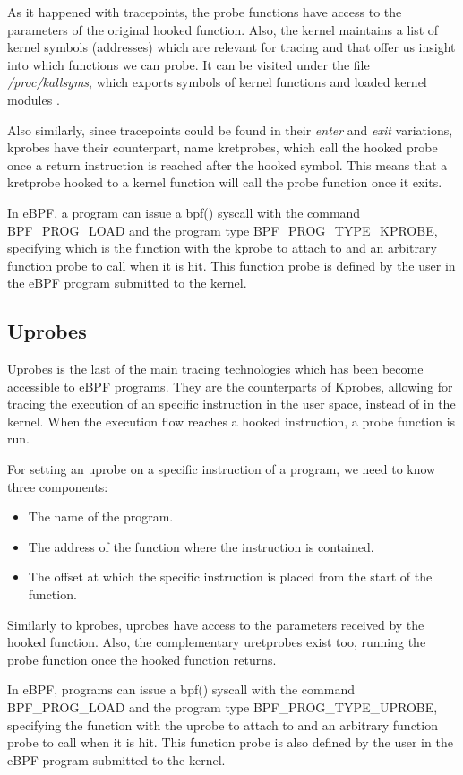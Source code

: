 As it happened with tracepoints, the probe functions have access to the parameters of the original hooked function. Also, the kernel maintains a list of kernel symbols (addresses) which are relevant for tracing and that offer us insight into which functions we can probe. It can be visited under the file \textit{/proc/kallsyms}, which exports symbols of kernel functions and loaded kernel modules \cite{kallsyms_kernel}.

Also similarly, since tracepoints could be found in their \textit{enter} and \textit{exit} variations, kprobes have their counterpart, name kretprobes, which call the hooked probe once a return instruction is reached after the hooked symbol. This means that a kretprobe hooked to a kernel function will call the probe function once it exits.

In eBPF, a program can issue a bpf() syscall with the command BPF\_PROG\_LOAD and the program type BPF\_PROG\_TYPE\_KPROBE, specifying which is the function with the kprobe to attach to and an arbitrary function probe to call when it is hit. This function probe is defined by the user in the eBPF program submitted to the kernel.

\subsection{Uprobes}
Uprobes is the last of the main tracing technologies which has been become accessible to eBPF programs. They are the counterparts of Kprobes, allowing for tracing the execution of an specific instruction in the user space, instead of in the kernel. When the execution flow reaches a hooked instruction, a probe function is run. 

For setting an uprobe on a specific instruction of a program, we need to know three components:
\begin{itemize}
\item The name of the program.
\item The address of the function where the instruction is contained.
\item The offset at which the specific instruction is placed from the start of the function.
\end{itemize}

Similarly to kprobes, uprobes have access to the parameters received by the hooked function. Also, the complementary uretprobes exist too, running the probe function once the hooked function returns.

In eBPF, programs can issue a bpf() syscall with the command BPF\_PROG\_LOAD and the program type BPF\_PROG\_TYPE\_UPROBE, specifying the function with the uprobe to attach to and an arbitrary function probe to call when it is hit. This function probe is also defined by the user in the eBPF program submitted to the kernel.

